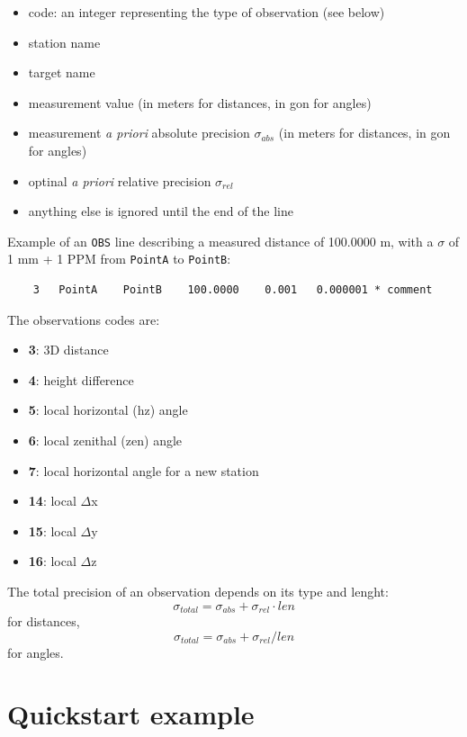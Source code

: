 \begin{itemize}
    \item code: an integer representing the type of observation (see below)
    \item station name
    \item target name
    \item measurement value (in meters for distances, in gon for angles)
    \item measurement \textit{a priori} absolute precision $\sigma_{abs}$ (in meters for distances, in gon for angles)
    \item optinal \textit{a priori} relative precision $\sigma_{rel}$
    \item anything else is ignored until the end of the line
\end{itemize}

Example of an \texttt{OBS} line describing a measured distance of 100.0000 m, with a $\sigma$ of 1 mm + 1 PPM from \texttt{PointA} to \texttt{PointB}:

\begin{lstlisting}
    3   PointA    PointB    100.0000    0.001   0.000001 * comment
\end{lstlisting}

The observations codes are:

\begin{itemize}
    \item \textbf{3}: 3D distance
    \item \textbf{4}: height difference
    \item \textbf{5}: local horizontal (hz) angle
    \item \textbf{6}: local zenithal (zen) angle
    \item \textbf{7}: local horizontal angle for a new station 
    \item \textbf{14}: local $\Delta$x
    \item \textbf{15}: local $\Delta$y
    \item \textbf{16}: local $\Delta$z
\end{itemize}

The total precision of an observation depends on its type and lenght:
$$\sigma_{total} = \sigma_{abs} + \sigma_{rel} \cdot len$$ for distances,
$$\sigma_{total} = \sigma_{abs} + \sigma_{rel} / len$$ for angles.

\newpage
\section{Quickstart example}

